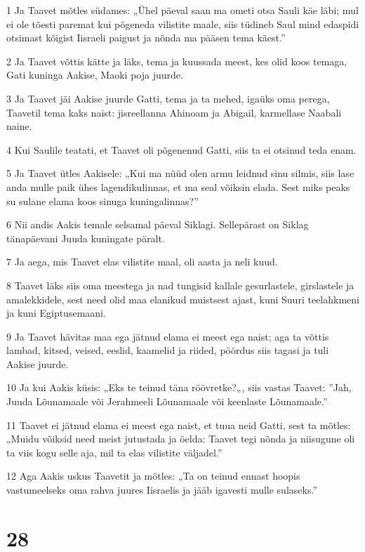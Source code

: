 \par 1 Ja Taavet mõtles südames: „Ühel päeval saan ma ometi otsa Sauli käe läbi; mul ei ole tõesti paremat kui põgeneda vilistite maale, siis tüdineb Saul mind edaspidi otsimast kõigist Iisraeli paigust ja nõnda ma pääsen tema käest.”
\par 2 Ja Taavet võttis kätte ja läks, tema ja kuussada meest, kes olid koos temaga, Gati kuninga Aakise, Maoki poja juurde.
\par 3 Ja Taavet jäi Aakise juurde Gatti, tema ja ta mehed, igaüks oma perega, Taavetil tema kaks naist: jisreellanna Ahinoam ja Abigail, karmellase Naabali naine.
\par 4 Kui Saulile teatati, et Taavet oli põgenenud Gatti, siis ta ei otsinud teda enam.
\par 5 Ja Taavet ütles Aakisele: „Kui ma nüüd olen armu leidnud sinu silmis, siis lase anda mulle paik ühes lagendikulinnas, et ma seal võiksin elada. Sest miks peaks su sulane elama koos sinuga kuningalinnas?”
\par 6 Nii andis Aakis temale selsamal päeval Siklagi. Sellepärast on Siklag tänapäevani Juuda kuningate päralt.
\par 7 Ja aega, mis Taavet elas vilistite maal, oli aasta ja neli kuud.
\par 8 Taavet läks siis oma meestega ja nad tungisid kallale gesurlastele, girslastele ja amalekkidele, sest need olid maa elanikud muistsest ajast, kuni Suuri teelahkmeni ja kuni Egiptusemaani.
\par 9 Ja Taavet hävitas maa ega jätnud elama ei meest ega naist; aga ta võttis lambad, kitsed, veised, eeslid, kaamelid ja riided, pöördus siis tagasi ja tuli Aakise juurde.
\par 10 Ja kui Aakis küsis: „Eks te teinud täna röövretke?„, siis vastas Taavet: ”Jah, Juuda Lõunamaale või Jerahmeeli Lõunamaale või keenlaste Lõunamaale.”
\par 11 Taavet ei jätnud elama ei meest ega naist, et tuua neid Gatti, sest ta mõtles: „Muidu võiksid need meist jutustada ja öelda: Taavet tegi nõnda ja niisugune oli ta viis kogu selle aja, mil ta elas vilistite väljadel.”
\par 12 Aga Aakis uskus Taavetit ja mõtles: „Ta on teinud ennast hoopis vastumeelseks oma rahva juures Iisraelis ja jääb igavesti mulle sulaseks.”

\chapter{28}

